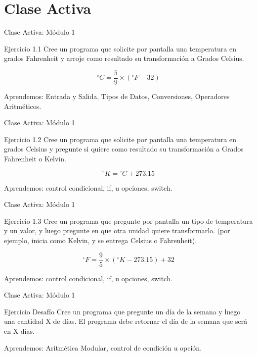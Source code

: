\documentclass{beamer}
\begin{document}
\section{Clase Activa}
\begin{frame}[fragile]{Clase Activa: Módulo 1}
\begin{exampleblock}{Ejercicio 1.1}
Cree un programa que solicite por pantalla una temperatura en grados Fahrenheit y arroje como resultado su transformación a Grados Celsius.

$$ {^\circ}C = \frac{5}{9} \times ({^\circ}F - 32) $$
\end{exampleblock}

{\tiny Aprendemos: Entrada y Salida, Tipos de Datos, Conversiones, Operadores Aritméticos.}
\end{frame}

\begin{frame}[fragile]{Clase Activa: Módulo 1}
\begin{exampleblock}{Ejercicio 1.2}
Cree un programa que solicite por pantalla una temperatura en grados Celsius y pregunte si quiere como resultado su transformación a Grados Fahrenheit o Kelvin.

$$ {^\circ}K = {^\circ}C + 273.15 $$
\end{exampleblock}

{\tiny Aprendemos: control condicional, if, u opciones, switch.}
\end{frame}

\begin{frame}[fragile]{Clase Activa: Módulo 1}
\begin{exampleblock}{Ejercicio 1.3}
Cree un programa que pregunte por pantalla un tipo de temperatura y un valor, y luego pregunte en que otra unidad quiere transformarlo. (por ejemplo, inicia como Kelvin, y se entrega Celsius o Fahrenheit).

$$ {^\circ}F = \frac{9}{5} \times ({^\circ}K - 273.15) + 32 $$
\end{exampleblock}

{\tiny Aprendemos: control condicional, if, u opciones, switch.}
\end{frame}

\begin{frame}[fragile]{Clase Activa: Módulo 1}
\begin{exampleblock}{Ejercicio Desafío}
Cree un programa que pregunte un día de la semana y luego una cantidad X de días. El programa debe retornar el día de la semana que será en X días.
\end{exampleblock}

{\tiny Aprendemos: Aritmética Modular, control de condición u opción. }
\end{frame}
\end{document}
